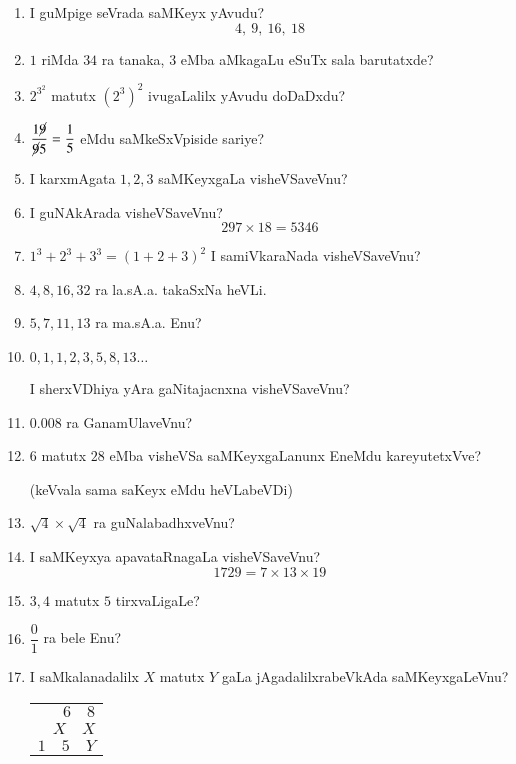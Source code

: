 \begin{enumerate}
\item I guMpige seVrada saMKeyx yAvudu?
$$
4,~9,~16,~18
$$

\item $1$ riMda $34$ ra tanaka, $3$ eMba aMkagaLu eSuTx sala barutatxde?

\item $2^{3^{2}}$ matutx $(2^{3})^{2}$ ivugaLalilx yAvudu doDaDxdu?

\item $\dfrac{1\cancel{9}}{\cancel{9}5}=\dfrac{1}{5}$ eMdu saMkeSxVpiside sariye?

\item I karxmAgata $1,2,3$ saMKeyxgaLa visheVSaveVnu?

\item I guNAkArada visheVSaveVnu?
$$
297\times 18=5346
$$

\item $1^{3}+2^{3}+3^{3}=(1+2+3)^{2}$ I samiVkaraNada visheVSaveVnu?

\item $4,8,16,32$ ra la.sA.a. takaSxNa heVLi.

\item $5,7,11,13$ ra ma.sA.a. Enu?

\item $0,1,1,2,3,5,8,13\ldots$

I sherxVDhiya yAra gaNitajacnxna visheVSaveVnu?

\item $0.008$ ra GanamUlaveVnu?

\item $6$ matutx $28$ eMba visheVSa saMKeyxgaLanunx EneMdu kareyutetxVve?

(keVvala sama saKeyx eMdu heVLabeVDi)

\item $\sqrt{4}\times \sqrt{4}$ ra guNalabadhxveVnu?

\item I saMKeyxya apavataRnagaLa visheVSaveVnu?
$$
1729=7\times 13\times 19
$$

\item $3,4$ matutx $5$ tirxvaLigaLe?

\item $\dfrac{0}{1}$ ra bele Enu?

\item I saMkalanadalilx $X$ matutx $Y$ gaLa jAgadalilxrabeVkAda saMKeyxgaLeVnu?
\begin{center}
\begin{tabular}{r}
$6\quad 8$\\
$X\quad X$\\
\hline
$1\quad 5\quad Y$
\end{tabular}
\end{center}


\end{enumerate}
